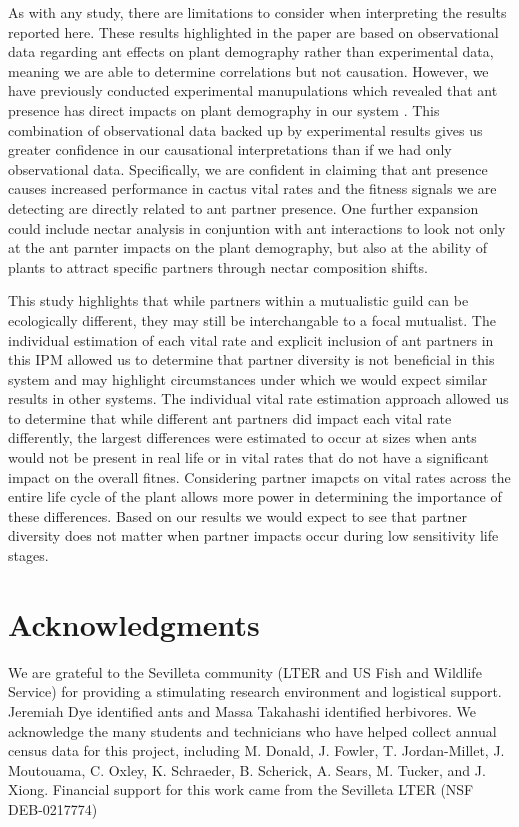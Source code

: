 \documentclass[11pt]{article}
\begin{document}
As with any study, there are limitations to consider when interpreting the results reported here.
These results highlighted in the paper are based on observational data regarding ant effects on plant demography rather than experimental data, meaning we are able to determine correlations but not causation.
However, we have previously conducted experimental manupulations which revealed that ant presence has direct impacts on plant demography in our system \citep{Miller2007}.
This combination of observational data backed up by experimental results gives us greater confidence in our causational interpretations than if we had only observational data.
Specifically, we are confident in claiming that ant presence causes increased performance in cactus vital rates and the fitness signals we are detecting are directly related to ant partner presence.
One further expansion could include nectar analysis in conjuntion with ant interactions to look not only at the ant parnter impacts on the plant demography, but also at the ability of plants to attract specific partners through nectar composition shifts. 

This study highlights that while partners within a mutualistic guild can be ecologically different, they may still be interchangable to a focal mutualist.
The individual estimation of each vital rate and explicit inclusion of ant partners in this IPM allowed us to determine that partner diversity is not beneficial in this system and may highlight circumstances under which we would expect similar results in other systems.
The individual vital rate estimation approach allowed us to determine that while different ant partners did impact each vital rate differently, the largest differences were estimated to occur at sizes when ants would not be present in real life or in vital rates that do not have a significant impact on the overall fitnes.
Considering partner imapcts on vital rates across the entire life cycle of the plant allows more power in determining the importance of these differences.
Based on our results we would expect to see that partner diversity does not matter when partner impacts occur during low sensitivity life stages.


\section*{Acknowledgments}
We are grateful to the Sevilleta community (LTER and US Fish and Wildlife Service) for providing a stimulating research environment and logistical support. 
Jeremiah Dye identified ants and Massa Takahashi identified herbivores. 
We acknowledge the many students and technicians who have helped collect annual census data for this project, including M. Donald, J. Fowler, T. Jordan-Millet, J. Moutouama, C. Oxley, K. Schraeder, B. Scherick, A. Sears, M. Tucker, and J. Xiong.
Financial support for this work came from the Sevilleta LTER (NSF DEB-0217774)
\end{document}
